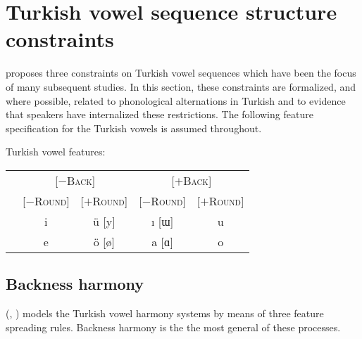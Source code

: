 

\section{Turkish vowel sequence structure constraints}

\citet{Lees1966b,Lees1966a} 
proposes three constraints on Turkish vowel sequences which have been the focus of many subsequent studies. In this section, these constraints are formalized, and where possible, related to phonological alternations in Turkish and to evidence that speakers have internalized these restrictions. The following feature specification for the Turkish vowels is assumed throughout.

\begin{example}
Turkish vowel features:

\vspace{0.5\baselineskip}
\begin{tabular}{c | c c c c}
                       & \multicolumn{2}{c}{[$-$\textsc{Back}]} & \multicolumn{2}{c}{[$+$\textsc{Back}]} \\
                       & [$-$\textsc{Round}] & [$+$\textsc{Round}] & [$-$\textsc{Round}] & [$+$\textsc{Round}] \\ \midrule
{} & {i} & {ü} [y] & {ı} [ɯ] & {u} \\
 & {e} & {ö} [ø] & {a} [ɑ] & {o} \\
\end{tabular}
\end{example}

\subsection{Backness harmony}

\citeauthor{Lees1966b} (\citeyear[][35]{Lees1966b}, \citeyear[][284]{Lees1966a}) models the Turkish vowel harmony systems by means of three feature spreading rules. Backness harmony is the the most general of these processes.  

